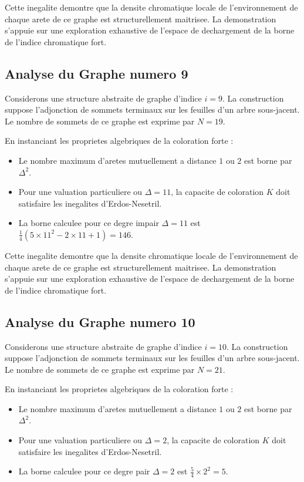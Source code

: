 \documentclass[11pt,a4paper]{article}
\begin{document}
Cette inegalite demontre que la densite chromatique locale de l'environnement de chaque arete de ce graphe est structurellement maitrisee. La demonstration s'appuie sur une exploration exhaustive de l'espace de dechargement de la borne de l'indice chromatique fort.

\subsection{Analyse du Graphe numero 9}
Considerons une structure abstraite de graphe d'indice $i = 9$. La construction suppose l'adjonction de sommets terminaux sur les feuilles d'un arbre sous-jacent. Le nombre de sommets de ce graphe est exprime par $N = 19$.

En instanciant les proprietes algebriques de la coloration forte :
\begin{itemize}
\item Le nombre maximum d'aretes mutuellement a distance $1$ ou $2$ est borne par $\Delta^2$.
\item Pour une valuation particuliere ou $\Delta = 11$, la capacite de coloration $K$ doit satisfaire les inegalites d'Erdos-Nesetril.
\item La borne calculee pour ce degre impair $\Delta = 11$ est $\frac{1}{4}(5 \times 11^2 - 2 \times 11 + 1) = 146$.
\end{itemize}

Cette inegalite demontre que la densite chromatique locale de l'environnement de chaque arete de ce graphe est structurellement maitrisee. La demonstration s'appuie sur une exploration exhaustive de l'espace de dechargement de la borne de l'indice chromatique fort.

\subsection{Analyse du Graphe numero 10}
Considerons une structure abstraite de graphe d'indice $i = 10$. La construction suppose l'adjonction de sommets terminaux sur les feuilles d'un arbre sous-jacent. Le nombre de sommets de ce graphe est exprime par $N = 21$.

En instanciant les proprietes algebriques de la coloration forte :
\begin{itemize}
\item Le nombre maximum d'aretes mutuellement a distance $1$ ou $2$ est borne par $\Delta^2$.
\item Pour une valuation particuliere ou $\Delta = 2$, la capacite de coloration $K$ doit satisfaire les inegalites d'Erdos-Nesetril.
\item La borne calculee pour ce degre pair $\Delta = 2$ est $\frac{5}{4} \times 2^2 = 5$.
\end{itemize}
\end{document}
